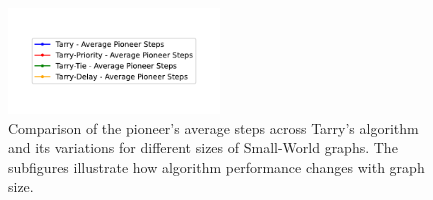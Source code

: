 \begin{figure}[H]
    \centering
    \qquad
    \qquad
    \includegraphics[width=0.5\textwidth]{Cap3/tarry_var_steps_legend.pdf}
    \newline
    \qquad
    \newline
    \qquad
    \caption{Comparison of the pioneer's average steps across Tarry's algorithm and its variations for different sizes of Small-World graphs. The subfigures illustrate how algorithm performance changes with graph size.} 
    \label{fig_tarry_steps_all_sizes_sw} 
\end{figure}

